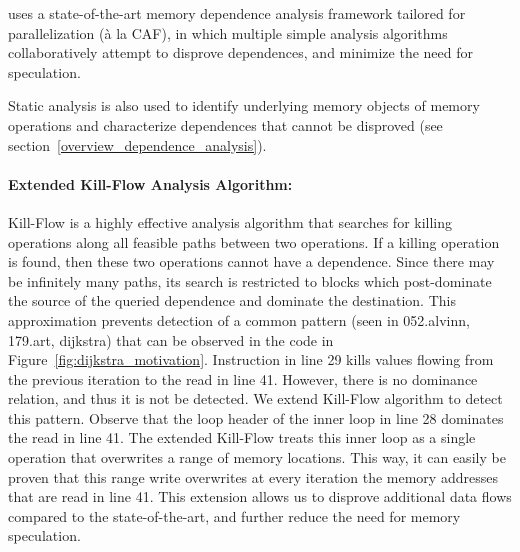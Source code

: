 \name uses a state-of-the-art memory dependence analysis framework
tailored for parallelization (\`{a} la CAF\cite{johnson:cgo:17}), in
which multiple simple analysis algorithms collaboratively attempt to
disprove dependences, and minimize the need for speculation.

Static analysis is also used to identify underlying memory objects of
memory operations and characterize dependences that cannot
be disproved (see section~\ref{overview_dependence_analysis}).

\paragraph{Extended Kill-Flow Analysis Algorithm:}
Kill-Flow is a highly effective analysis algorithm that searches for
killing operations along all feasible paths between two operations. If
a killing operation is found, then these two operations cannot have a
dependence.  Since  there  may  be  infinitely  many  paths,  its
search is restricted to blocks which post-dominate the source of the
queried dependence and dominate the destination.
%
This approximation prevents detection of a common pattern (seen in
052.alvinn, 179.art, dijkstra) that can be observed in the code in
Figure~\ref{fig:dijkstra_motivation}.
%
Instruction in line 29 kills values flowing from the previous
iteration to the read in line 41.  However, there is no dominance
relation, and thus it is not be detected.
%
We extend Kill-Flow algorithm to detect this pattern.  Observe that
the loop header of the inner loop in line 28 dominates the read in
line 41.  The extended Kill-Flow treats this inner loop as a single
operation that overwrites a range of memory locations. This way, it
can easily be proven that this range write overwrites at every
iteration the memory addresses that are read in line 41.
%
%
This extension allows us to disprove additional data flows compared to
the state-of-the-art, and further reduce the need for memory
speculation.
